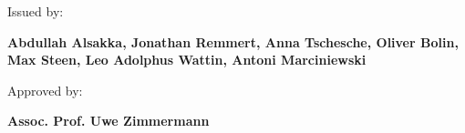 \begin{titlepage}
Issued by:
\vspace{0.3cm}

{\large \textbf{Abdullah Alsakka,
Jonathan Remmert,
Anna Tschesche,
Oliver Bolin,
Max Steen,
Leo Adolphus Wattin,
Antoni Marciniewski}} %

Approved by:
\vspace{0.3cm}

{\large \textbf{Assoc. Prof. Uwe Zimmermann}} 



\end{titlepage}
